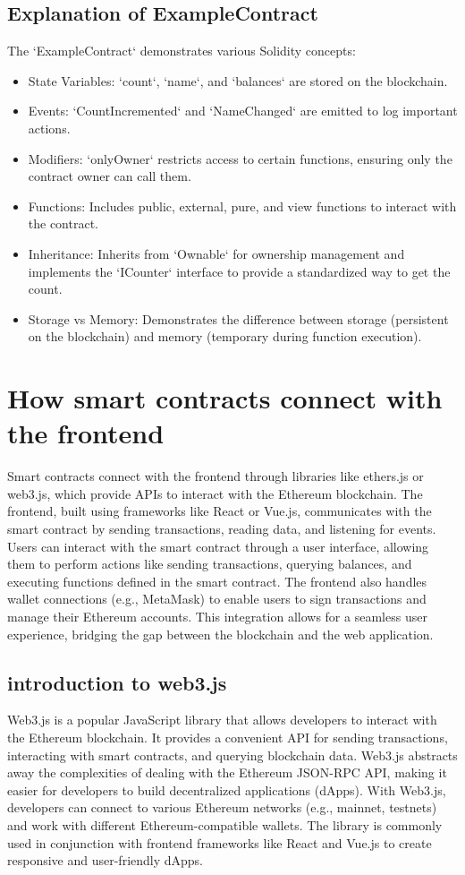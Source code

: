 \documentclass[12pt, a4paper]{article}
\begin{document}
\subsection{Explanation of ExampleContract}
The `ExampleContract` demonstrates various Solidity concepts:
\begin{itemize}
    \item State Variables: `count`, `name`, and `balances` are stored on the blockchain.
    \item Events: `CountIncremented` and `NameChanged` are emitted to log important actions.
    \item Modifiers: `onlyOwner` restricts access to certain functions, ensuring only the contract owner can call them.
    \item Functions: Includes public, external, pure, and view functions to interact with the contract.
    \item Inheritance: Inherits from `Ownable` for ownership management and implements the `ICounter` interface to provide a standardized way to get the count.
    \item Storage vs Memory: Demonstrates the difference between storage (persistent on the blockchain) and memory (temporary during function execution).
\end{itemize}
\section{How smart contracts connect with the frontend}
Smart contracts connect with the frontend through libraries like ethers.js or web3.js, which provide APIs to interact with the Ethereum blockchain. The frontend, built using frameworks like React or Vue.js, communicates with the smart contract by sending transactions, reading data, and listening for events. Users can interact with the smart contract through a user interface, allowing them to perform actions like sending transactions, querying balances, and executing functions defined in the smart contract. The frontend also handles wallet connections (e.g., MetaMask) to enable users to sign transactions and manage their Ethereum accounts. This integration allows for a seamless user experience, bridging the gap between the blockchain and the web application.
\subsection{introduction to web3.js}
Web3.js is a popular JavaScript library that allows developers to interact with the Ethereum blockchain. It provides a convenient API for sending transactions, interacting with smart contracts, and querying blockchain data. Web3.js abstracts away the complexities of dealing with the Ethereum JSON-RPC API, making it easier for developers to build decentralized applications (dApps). With Web3.js, developers can connect to various Ethereum networks (e.g., mainnet, testnets) and work with different Ethereum-compatible wallets. The library is commonly used in conjunction with frontend frameworks like React and Vue.js to create responsive and user-friendly dApps.
\end{document}
